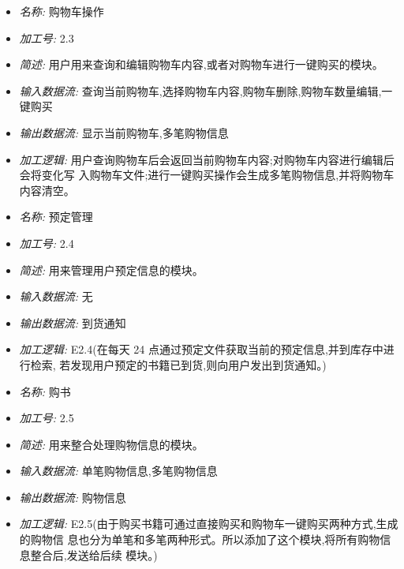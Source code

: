 \documentclass{article}
\begin{document}
\begin{CJK*}{UTF8}{gbsn}
\begin{itemize}
\end{itemize}


\vspace{-1mm}


\begin{itemize}
\item \textit{名称: } 购物车操作
\item \textit{加工号: }2.3 
\item \textit{简述: }用户用来查询和编辑购物车内容,或者对购物车进行一键购买的模块。 
\item \textit{输入数据流: }查询当前购物车,选择购物车内容,购物车删除,购物车数量编辑,一键购买 
\item \textit{输出数据流: }显示当前购物车,多笔购物信息 
\item \textit{加工逻辑: }用户查询购物车后会返回当前购物车内容;对购物车内容进行编辑后会将变化写 入购物车文件;进行一键购买操作会生成多笔购物信息,并将购物车内容清空。

\end{itemize}


\vspace{-1mm}


\begin{itemize}
\item \textit{名称: } 预定管理
\item \textit{加工号: }2.4
\item \textit{简述: }用来管理用户预定信息的模块。
\item \textit{输入数据流: }无
\item \textit{输出数据流: }到货通知
\item \textit{加工逻辑: }E2.4(在每天 24 点通过预定文件获取当前的预定信息,并到库存中进行检索, 若发现用户预定的书籍已到货,则向用户发出到货通知。)

\end{itemize}


\vspace{-1mm}


\begin{itemize}
\item \textit{名称: }购书
\item \textit{加工号: }2.5 
\item \textit{简述: }用来整合处理购物信息的模块。 
\item \textit{输入数据流: }单笔购物信息,多笔购物信息
\item \textit{输出数据流: }购物信息 
\item \textit{加工逻辑: }E2.5(由于购买书籍可通过直接购买和购物车一键购买两种方式,生成的购物信 息也分为单笔和多笔两种形式。所以添加了这个模块,将所有购物信息整合后,发送给后续 模块。)


\end{itemize}
\end{CJK*}
\end{document}
